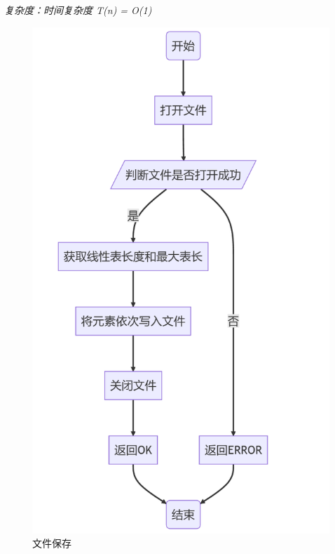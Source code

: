 \documentclass[supercite]{Experimental_Report}
\theoremstyle{definition}
\begin{document}
\begin{enumerate}
	\emph{复杂度：时间复杂度 T(n) = O(1)}
	\begin{figure}[H]
	\centering
	\begin{minipage}{0.7\linewidth}
		\centering
		\includegraphics[width=0.9\linewidth]{images/文件保存.png}
	\end{minipage}
	\caption{文件保存}
	\label{fig1-5}
\end{figure}


\end{enumerate}
\end{document}
